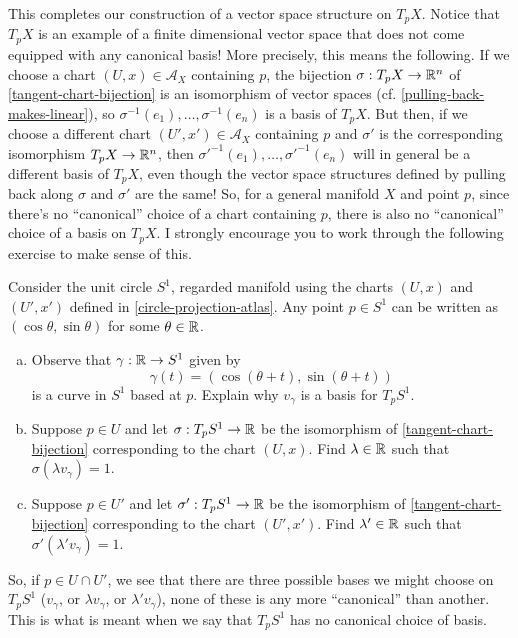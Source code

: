 This completes our construction of a vector space structure on $T_p X$. Notice that $T_p X$ is an example of a finite dimensional vector space that does not come equipped with any canonical basis! More precisely, this means the following. If we choose a chart $(U, x) \in \mathscr{A}_X$ containing $p$, the bijection $\sigma : T_p X \to \mathbb{R}^n$ of \cref{tangent-chart-bijection} is an isomorphism of vector spaces (cf. \cref{pulling-back-makes-linear}), so $\sigma^{-1}(e_1), \dotsc, \sigma^{-1}(e_n)$ is a basis of $T_p X$. But then, if we choose a different chart $(U', x') \in \mathscr{A}_X$ containing $p$ and $\sigma'$ is the corresponding isomorphism $T_p X \to \mathbb{R}^n$, then $\sigma'^{-1}(e_1), \dotsc, \sigma'^{-1}(e_n)$ will in general be a different basis of $T_p X$, even though the vector space structures defined by pulling back along $\sigma$ and $\sigma'$ are the same! So, for a general manifold $X$ and point $p$, since there's no ``canonical'' choice of a chart containing $p$, there is also no ``canonical'' choice of a basis on $T_p X$. I strongly encourage you to work through the following exercise to make sense of this. 

\begin{exercise}
	Consider the unit circle $S^1$, regarded manifold using the charts $(U,x)$ and $(U',x')$ defined in  \cref{circle-projection-atlas}. Any point $p \in S^1$ can be written as $(\cos \theta, \sin \theta)$ for some $\theta \in \mathbb{R}$. 
	\begin{enumerate}[(a)]
		\item Observe that $\gamma : \mathbb{R} \to S^1$ given by \[ \gamma(t) = (\cos(\theta + t), \sin(\theta + t)) \] is a curve in $S^1$ based at $p$. Explain why $v_\gamma$ is a basis for $T_p S^1$. 
		\item Suppose $p \in U$ and let $\sigma : T_p S^1 \to \mathbb{R}$ be the isomorphism of \cref{tangent-chart-bijection} corresponding to the chart $(U, x)$. Find $\lambda \in \mathbb{R}$ such that $\sigma(\lambda v_\gamma) = 1$. 
		\item Suppose $p \in U'$ and let $\sigma' : T_p S^1 \to \mathbb{R}$ be the isomorphism of \cref{tangent-chart-bijection} corresponding to the chart $(U', x')$. Find $\lambda' \in \mathbb{R}$ such that $\sigma'(\lambda' v_\gamma) = 1$. 
	\end{enumerate}
	So, if $p \in U \cap U'$, we see that there are three possible bases we might choose on $T_p S^1$ ($v_\gamma$, or $\lambda v_\gamma$, or $\lambda' v_\gamma$), none of these is any more ``canonical'' than another. This is what is meant when we say that $T_p S^1$ has no canonical choice of basis. 
\end{exercise}

